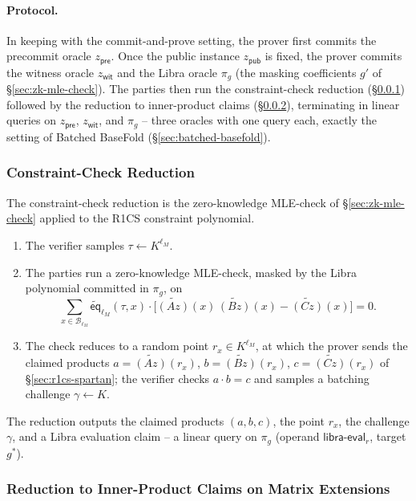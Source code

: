\documentclass{article}
\theoremstyle{definition}
\newcommand*{\mle}{\widetilde}
\newcommand{\eq}{\mathsf{eq}}
\newcommand{\BB}{\mathcal{B}}
\begin{document}
\paragraph{Protocol.}
In keeping with the commit-and-prove setting, the prover first commits the precommit oracle $z_{\textsf{pre}}$. Once the public instance $z_{\textsf{pub}}$ is fixed, the prover commits the witness oracle $z_{\textsf{wit}}$ and the Libra oracle $\pi_g$ (the masking coefficients $g'$ of \S\ref{sec:zk-mle-check}). The parties then run the constraint-check reduction (\S\ref{sec:constraint-check-reduction}) followed by the reduction to inner-product claims (\S\ref{sec:ip-reduction}), terminating in linear queries on $z_{\textsf{pre}}$, $z_{\textsf{wit}}$, and $\pi_g$ -- three oracles with one query each, exactly the setting of Batched BaseFold (\S\ref{sec:batched-basefold}).

\subsubsection{Constraint-Check Reduction}
\label{sec:constraint-check-reduction}

The constraint-check reduction is the zero-knowledge MLE-check of \S\ref{sec:zk-mle-check} applied to the R1CS constraint polynomial.
\begin{enumerate}
\item The verifier samples $\tau \gets K^{\ell_M}$.
\item The parties run a zero-knowledge MLE-check, masked by the Libra polynomial committed in $\pi_g$, on
\[
  \sum_{x \in \BB_{\ell_M}} \mle{\eq}_{\ell_M}(\tau, x) \cdot \bigl[ \mle{(Az)}(x)\, \mle{(Bz)}(x) - \mle{(Cz)}(x) \bigr] = 0.
\]
\item The check reduces to a random point $r_x \in K^{\ell_M}$, at which the prover sends the claimed products $a = \mle{(Az)}(r_x)$, $b = \mle{(Bz)}(r_x)$, $c = \mle{(Cz)}(r_x)$ of \S\ref{sec:r1cs-spartan}; the verifier checks $a \cdot b = c$ and samples a batching challenge $\gamma \gets K$.
\end{enumerate}
The reduction outputs the claimed products $(a, b, c)$, the point $r_x$, the challenge $\gamma$, and a Libra evaluation claim -- a linear query on $\pi_g$ (operand $\textsf{libra-eval}_r$, target $g^*$).

\subsubsection{Reduction to Inner-Product Claims on Matrix Extensions}
\label{sec:ip-reduction}
\end{document}
